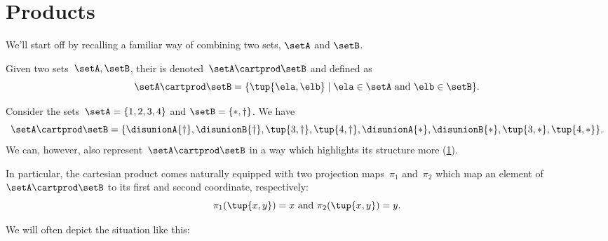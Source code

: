 

\section{Products}
\label{sec:combination-products}

We'll start off by recalling a familiar way of combining two sets, $\setA$ and $\setB$.


\begin{definition}
  \label{def:cartesian-product}
  Given two sets~$\setA,\setB$, their \emph{} is denoted~$\setA \cartprod  \setB$ and defined as
  \begin{equation*}
    \setA \cartprod \setB =\{ \tup{\ela,\elb}\mid \ela \in \setA \text{ and } \elb \in \setB \}.
  \end{equation*}
\end{definition}

\begin{example}
  Consider the sets~$\setA = \{1, 2, 3, 4\}$ and $\setB = \{ \ast, \dagger \}$.
  We have
  \begin{equation*}
    \setA \cartprod \setB = \{ \disunionA{\dagger}, \disunionB{ \dagger}, \tup{3, \dagger}, \tup{4, \dagger}, \disunionA{*}, \disunionB{ *}, \tup{3, *}, \tup{4, *} \}.
  \end{equation*}
  We can, however, also represent~$\setA \cartprod \setB$ in a way which highlights its structure more (\cref{fig:example_cartesian}).

  \begin{figure}[h!]
    \begin{center}
    \end{center}
    \caption{\label{fig:example_cartesian}}
  \end{figure}
  In particular, the cartesian product comes naturally equipped with two projection maps~$\pi_1$ and~$\pi_2$ which map an element of~$\setA \cartprod \setB$ to its first and second coordinate, respectively:
  \begin{equation*}
    \pi_1(\tup{x,y}) =  x \text{ and } \pi_2(\tup{x,y}) = y.
  \end{equation*}

  We will often depict the situation like this:
  \begin{center}
  \end{center}
\end{example}

